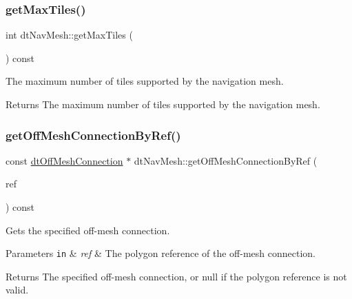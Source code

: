 \subsubsection{\texorpdfstring{get\+Max\+Tiles()}{getMaxTiles()}\hspace{0.1cm}{\footnotesize\ttfamily [2/2]}}
{\footnotesize\ttfamily int dt\+Nav\+Mesh\+::get\+Max\+Tiles (\begin{DoxyParamCaption}{ }\end{DoxyParamCaption}) const}

The maximum number of tiles supported by the navigation mesh. \begin{DoxyReturn}{Returns}
The maximum number of tiles supported by the navigation mesh. 
\end{DoxyReturn}
\mbox{\label{classdtNavMesh_a1db2c979241da0b6e0fda278206678de}} 
\subsubsection{\texorpdfstring{get\+Off\+Mesh\+Connection\+By\+Ref()}{getOffMeshConnectionByRef()}\hspace{0.1cm}{\footnotesize\ttfamily [1/2]}}
{\footnotesize\ttfamily const \hyperlink{structdtOffMeshConnection}{dt\+Off\+Mesh\+Connection} $\ast$ dt\+Nav\+Mesh\+::get\+Off\+Mesh\+Connection\+By\+Ref (\begin{DoxyParamCaption}\item[{\hyperlink{group__detour_gab4e0b2257a670c1a800057999612b466}{dt\+Poly\+Ref}}]{ref }\end{DoxyParamCaption}) const}

Gets the specified off-\/mesh connection. 
\begin{DoxyParams}[1]{Parameters}
\mbox{\tt in}  & {\em ref} & The polygon reference of the off-\/mesh connection. \\
\hline
\end{DoxyParams}
\begin{DoxyReturn}{Returns}
The specified off-\/mesh connection, or null if the polygon reference is not valid. 
\end{DoxyReturn}
\mbox{\label{classdtNavMesh_a4dec3003fb84ea8f45a2519ec3bc2f0d}} 
